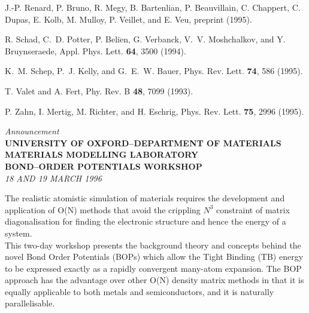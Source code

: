 {\begin{thebibliography}{m}
J.-P. Renard, P. Bruno, R. Megy, B. Bartenlian, P. Beauvillain, C. Chappert, C.
  Dupas, E. Kolb, M. Mulloy, P. Veillet, and E. Veu,   preprint  (1995).

R. Schad, C.~D. Potter, P. Beli$\ddot{\mbox{e}}$n, G. Verbanck, V.~V.
  Moshchalkov, and Y. Bruynseraede, Appl. Phys. Lett. {\bf 64},  3500  (1994).

K.~M. Schep, P.~J. Kelly, and G.~E.~W. Bauer, Phys. Rev. Lett. {\bf 74},  586
  (1995).

T. Valet and A. Fert, Phy. Rev. B {\bf 48},  7099  (1993).

P. Zahn, I. Mertig, M. Richter, and H. Eschrig, Phys. Rev. Lett. {\bf 75},
  2996  (1995).

\end{thebibliography}
%

\newpage
\null
\begin{center}
{\Large{\it Announcement}}\\[10mm]

{\Large{\bf UNIVERSITY OF OXFORD--DEPARTMENT OF MATERIALS}} \\
{\Large{\bf MATERIALS MODELLING LABORATORY}}\\

\bigskip
{\Large{\bf BOND--ORDER POTENTIALS WORKSHOP}} \\
{\large{\it 18 AND 19 MARCH 1996}}\\
\end{center}

\vspace{1cm}
\noindent
The realistic atomistic simulation of materials requires the
development and application of O(N) methods that avoid the
crippling $N^{3}$ constraint of matrix diagonalisation for
finding the electronic structure and hence the energy of
a system.\\

\noindent
This two-day workshop presents the background theory and concepts
behind the novel Bond Order Potentials (BOPs) which allow the
Tight Binding (TB) energy to be expressed exactly as a rapidly
convergent many-atom expansion. The BOP approach has the 
advantage over other O(N) density matrix methods in that it is
equally applicable to both metals and semiconductors, and it is
naturally parallelisable.\\

}
